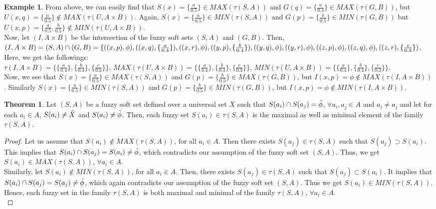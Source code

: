 \documentclass{article}
\theoremstyle{definition}
\newtheorem{theorem}{Theorem}[section]
\newtheorem{example}{Example}[section]
\begin{document}
\begin{example}
From above, we can easily find that $S(x)=\{\frac{a}{0.5}\}\in MAX(\tau(S,A))$ and $G(q)=\{\frac{a}{0.4}\}\in MAX(\tau(G,B))$, but $U(x, q)=\{\frac{a}{0.5}\}\notin MAX(\tau(U,A\times B))$. Again, $S(x)=\{\frac{a}{0.5}\}\in MIN(\tau(S,A))$ and $G(p)=\{\frac{b}{0.5}\}\in MIN(\tau(G,B))$ but $U(x, p)=\{ \frac{a}{0.5}, \frac{b}{0.5}\}\notin MIN(\tau(U,A\times B))$.\\

Now, let $(I, A\times B)$ be the intersection of the fuzzy soft sets $(S,A)$ and $(G,B)$. Then, $(I, A\times B)=(S,A)\cap (G,B)=\{((x, p), \phi), ((x, q), \{ \frac{a}{0.4}\}), ((x, r), \phi), ((y, p),\\ \{\frac{b}{0.4}\}), ((y, q), \phi), ((y, r), \phi), ((z, p), \phi), ((z, q), \phi), ((z, r), \{\frac{c}{0.3}\}) $.\\


Here, we get the followings:\\

$\tau(I,A\times B)=\{\{ \frac{a}{0.4}\}, \{\frac{b}{0.4}\}, \{\frac{c}{0.3}\}\}$, $MAX(\tau(U,A\times B))=\{\{ \frac{a}{0.4}\}, \{\frac{b}{0.4}\}, \{\frac{c}{0.3}\}\}$, $MIN(\tau(U,A\times B))=\{\{ \frac{a}{0.4}\}, \{\frac{b}{0.4}\}, \{\frac{c}{0.3}\}\}$.\\


Now, we see that $S(x)=\{\frac{a}{0.5}\}\in MAX(\tau(S,A))$ and $G(p)=\{\frac{b}{0.5}\}\in MAX(\tau(G,B))$, but $I(x, p)=\phi \notin MAX(\tau(I,A\times B))$. Similarly $S(x)=\{\frac{a}{0.5}\}\in MIN(\tau(S,A))$ and $G(p)=\{\frac{b}{0.5}\}\in MIN(\tau(G,B))$, but $I(x, p)=\phi \notin MIN(\tau(I,A\times B))$.
\end{example}

\begin{theorem}
    Let $(S,A)$ be a fuzzy soft set defined over a universal set $X$ such that $S(a_i) \cap S(a_j)=\Tilde{\phi}$, $\forall a_i, a_j \in A$ and $a_i\neq a_j$ and let for each $a_i \in A$, $S(a_i)\neq \Tilde{X}$ and $S(a_i)\neq \Tilde{\phi}$. Then, each fuzzy set $S(a_i)\in \tau(S,A)$ is the maximal as well as minimal element of the family $\tau(S,A)$.
\end{theorem}

\begin{proof}
 Let us assume that $S(a_i)\notin MAX(\tau(S,A))$, for all $a_i\in A$. Then there exists $S(a_j)\in \tau(S,A)$ such that $S(a_j)\supset S(a_i)$. This implies that $S(a_i)\cap S(a_j)=S(a_i)\neq \Tilde{\phi}$, which contradicts our assumption of the fuzzy soft set $(S,A)$. Thus, we get $S(a_i)\in MAX(\tau(S,A))$, $\forall a_i\in A$. \\

Similarly, let $S(a_i)\notin MIN(\tau(S,A))$, for all $a_i\in A$. Then, there exists $S(a_j)\in \tau(S,A)$ such that $S(a_j)\subset S(a_i)$. It implies that $S(a_i)\cap S(a_j)=S(a_j)\neq \Tilde{\phi}$, which again contradicts our assumption of the fuzzy soft set $(S,A)$. Thus we get $S(a_i)\in MIN(\tau(S,A))$. Hence, each fuzzy set in the family $\tau(S,A)$ is both maximal and minimal of the family $\tau(S,A)$, $\forall a_i\in A$.\\

\end{proof}
\end{document}
